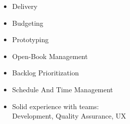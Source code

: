 
  \begin{itemize}
    \setlength\itemsep{-0.3em}
    \item Delivery
    \item Budgeting
    \item Prototyping
    \item Open-Book Management
    \item Backlog Prioritization
    \item Schedule And Time Management
    \item Solid experience with teams: \\ 
    Development,
    Quality Assurance,
    UX 
    \wt{
    }
    \wt{

    }
    \en{
% 
    } 
    \projectm{
    }
  \end{itemize}

  
